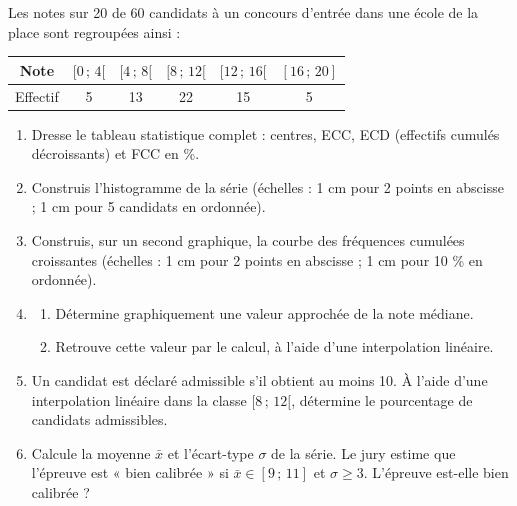 \documentclass[11pt]{article}
\begin{document}
\begin{exercice}
Les notes sur 20 de 60 candidats à un concours d'entrée dans une école de la place sont regroupées ainsi :
\begin{center}
\begin{tabular}{|c|ccccc|}\hline
Note & $[0\,;\,4[$ & $[4\,;\,8[$ & $[8\,;\,12[$ & $[12\,;\,16[$ & $[16\,;\,20]$ \\ \hline
Effectif & 5 & 13 & 22 & 15 & 5 \\ \hline
\end{tabular}
\end{center}
\begin{enumerate}
\item Dresse le tableau statistique complet : centres, ECC, ECD (effectifs cumulés décroissants) et FCC en \%.
\item Construis l'histogramme de la série (échelles : 1 cm pour 2 points en abscisse ; 1 cm pour 5 candidats en ordonnée).
\item Construis, sur un second graphique, la courbe des fréquences cumulées croissantes (échelles : 1 cm pour 2 points en abscisse ; 1 cm pour 10 \% en ordonnée).
\item \begin{enumerate}
\item Détermine graphiquement une valeur approchée de la note médiane.
\item Retrouve cette valeur par le calcul, à l'aide d'une interpolation linéaire.
\end{enumerate}
\item Un candidat est déclaré admissible s'il obtient au moins 10. À l'aide d'une interpolation linéaire dans la classe $[8\,;\,12[$, détermine le pourcentage de candidats admissibles.
\item Calcule la moyenne $\bar{x}$ et l'écart-type $\sigma$ de la série. Le jury estime que l'épreuve est « bien calibrée » si $\bar{x} \in [9\,;\,11]$ et $\sigma \geq 3$. L'épreuve est-elle bien calibrée ?
\end{enumerate}
\end{exercice}
\end{document}
